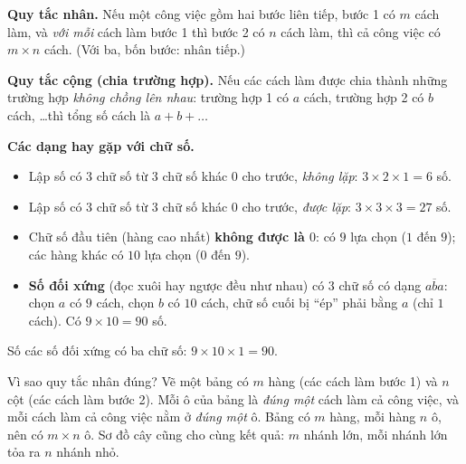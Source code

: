 \begin{knowbox}
\textbf{Quy tắc nhân.} Nếu một công việc gồm hai bước liên tiếp, bước 1 có $m$ cách làm, và \emph{với mỗi} cách làm bước 1 thì bước 2 có $n$ cách làm, thì cả công việc có $m\times n$ cách. (Với ba, bốn bước: nhân tiếp.)

\medskip
\textbf{Quy tắc cộng (chia trường hợp).} Nếu các cách làm được chia thành những trường hợp \emph{không chồng lên nhau}: trường hợp 1 có $a$ cách, trường hợp 2 có $b$ cách, \ldots thì tổng số cách là $a+b+\dots$

\medskip
\textbf{Các dạng hay gặp với chữ số.}
\begin{itemize}[leftmargin=1.2em,itemsep=1pt,topsep=2pt]
\item Lập số có $3$ chữ số từ $3$ chữ số khác $0$ cho trước, \emph{không lặp}: $3\times2\times1=6$ số.
\item Lập số có $3$ chữ số từ $3$ chữ số khác $0$ cho trước, \emph{được lặp}: $3\times3\times3=27$ số.
\item Chữ số đầu tiên (hàng cao nhất) \textbf{không được là $0$}: có $9$ lựa chọn ($1$ đến $9$); các hàng khác có $10$ lựa chọn ($0$ đến $9$).
\item \textbf{Số đối xứng} (đọc xuôi hay ngược đều như nhau) có $3$ chữ số có dạng $\overline{aba}$: chọn $a$ có $9$ cách, chọn $b$ có $10$ cách, chữ số cuối bị ``ép'' phải bằng $a$ (chỉ $1$ cách). Có $9\times10=90$ số.
\end{itemize}
\end{knowbox}

\vspace{-6pt}
\begin{center}\footnotesize Số các số đối xứng có ba chữ số: $9\times 10\times 1=90$.\end{center}

\begin{proofbox}
Vì sao quy tắc nhân đúng? Vẽ một bảng có $m$ hàng (các cách làm bước 1) và $n$ cột (các cách làm bước 2). Mỗi ô của bảng là \emph{đúng một} cách làm cả công việc, và mỗi cách làm cả công việc nằm ở \emph{đúng một} ô. Bảng có $m$ hàng, mỗi hàng $n$ ô, nên có $m\times n$ ô. Sơ đồ cây cũng cho cùng kết quả: $m$ nhánh lớn, mỗi nhánh lớn tỏa ra $n$ nhánh nhỏ.
\end{proofbox}

